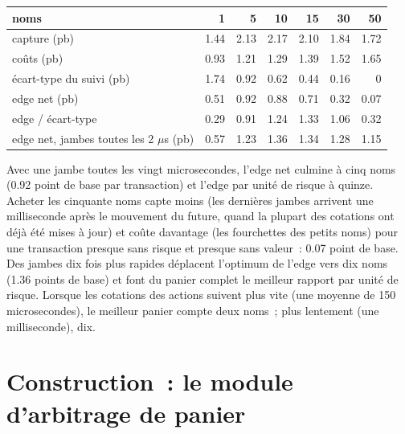 \begin{center}
\small
\begin{tabular}{@{}lrrrrrr@{}}
\toprule
noms & 1 & 5 & 10 & 15 & 30 & 50\\
\midrule
capture (pb) & 1.44 & 2.13 & 2.17 & 2.10 & 1.84 & 1.72\\
coûts (pb) & 0.93 & 1.21 & 1.29 & 1.39 & 1.52 & 1.65\\
écart-type du suivi (pb) & 1.74 & 0.92 & 0.62 & 0.44 & 0.16 & 0\\
edge net (pb) & 0.51 & 0.92 & 0.88 & 0.71 & 0.32 & 0.07\\
edge / écart-type & 0.29 & 0.91 & 1.24 & 1.33 & 1.06 & 0.32\\
edge net, jambes toutes les 2 $\mu$s (pb) & 0.57 & 1.23 & 1.36 & 1.34 & 1.28 & 1.15\\
\bottomrule
\end{tabular}
\end{center}

Avec une jambe toutes les vingt microsecondes, l'edge net culmine à cinq noms (0.92 point de base par transaction) et l'edge par unité de risque à quinze. Acheter
les cinquante noms capte moins (les dernières jambes arrivent une milliseconde après le mouvement du future, quand la plupart des cotations ont déjà été mises à jour) et coûte davantage (les fourchettes des petits
noms) pour une transaction presque sans risque et presque sans valeur~: 0.07 point de base. Des jambes dix fois plus rapides déplacent l'optimum de l'edge vers dix noms (1.36
points de base) et font du panier complet le meilleur rapport par unité de risque. Lorsque les cotations des actions suivent plus vite (une moyenne de 150 microsecondes), le meilleur panier
compte deux noms~; plus lentement (une milliseconde), dix.

\section{Construction~: le module d'arbitrage de panier}\label{bld:hf:index-and-basket-arbitrage:basketarb}

